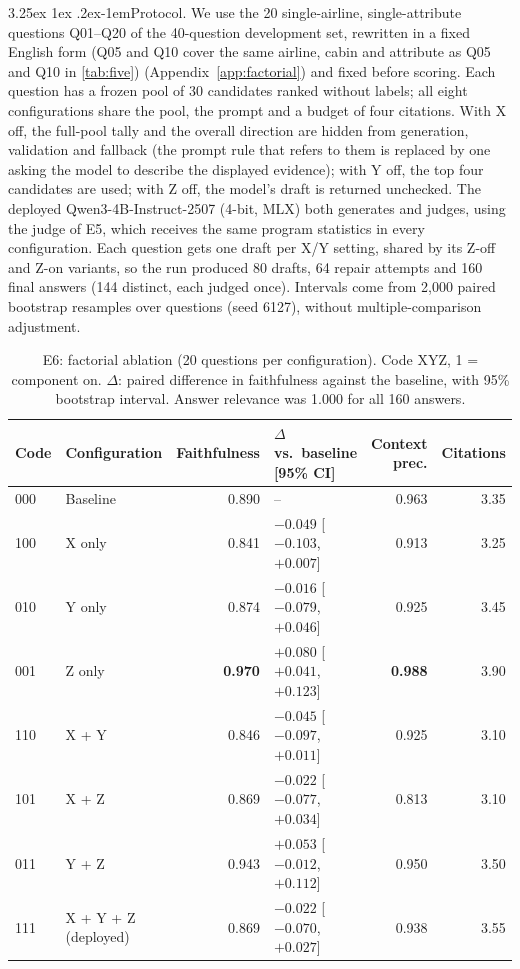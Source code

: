 \documentclass[10pt,twocolumn,a4paper]{article}
\makeatletter
\newcommand{\best}[1]{\textbf{#1}}
\renewcommand\paragraph{\@startsection{paragraph}{4}{\parindent}%
  {3.25ex \@plus 1ex \@minus .2ex}{-1em}{\normalfont\normalsize\bfseries}}
\makeatother
\begin{document}
\paragraph{Protocol.} We use the 20 single-airline, single-attribute questions Q01--Q20 of the 40-question
development set, rewritten in a fixed English form (Q05 and Q10 cover the same airline, cabin and attribute as Q05 and Q10 in
\cref{tab:five}) (Appendix~\ref{app:factorial}) and fixed before scoring. Each question has a frozen
pool of 30 candidates ranked without labels; all eight configurations share the pool, the prompt and a budget of four
citations. With X off, the full-pool tally and the overall direction are hidden from generation, validation and
fallback (the prompt rule that refers to them is replaced by one asking the model to describe the displayed evidence);
with Y off, the top four candidates are used; with Z off, the model's draft is returned unchecked. The deployed
Qwen3-4B-Instruct-2507 (4-bit, MLX) both generates and judges, using the judge of E5, which receives the same program
statistics in every configuration. Each question gets one draft per X/Y setting, shared by its Z-off and Z-on
variants, so the run produced 80 drafts, 64 repair attempts and 160 final answers (144 distinct, each judged once).
Intervals come from 2,000 paired bootstrap resamples over questions (seed 6127), without multiple-comparison
adjustment.

\begin{table}[t]
\centering\small
\caption{E6: factorial ablation (20 questions per configuration). Code XYZ, 1 = component on. $\Delta$: paired difference
in faithfulness against the baseline, with 95\% bootstrap interval. Answer relevance was 1.000 for all 160 answers.}
\label{tab:factorial}
\begin{tabular}{@{}llrlrr@{}}
\toprule
\textbf{Code} & \textbf{Configuration} & \textbf{Faithfulness} & \textbf{$\Delta$ vs.\ baseline [95\% CI]} & \textbf{Context prec.} & \textbf{Citations} \\
\midrule
000 & Baseline & 0.890 & -- & 0.963 & 3.35 \\
100 & X only & 0.841 & $-0.049$ [$-0.103$, $+0.007$] & 0.913 & 3.25 \\
010 & Y only & 0.874 & $-0.016$ [$-0.079$, $+0.046$] & 0.925 & 3.45 \\
\rowcolor{shade} 001 & Z only & \best{0.970} & $+0.080$ [$+0.041$, $+0.123$] & \best{0.988} & 3.90 \\
110 & X + Y & 0.846 & $-0.045$ [$-0.097$, $+0.011$] & 0.925 & 3.10 \\
101 & X + Z & 0.869 & $-0.022$ [$-0.077$, $+0.034$] & 0.813 & 3.10 \\
011 & Y + Z & 0.943 & $+0.053$ [$-0.012$, $+0.112$] & 0.950 & 3.50 \\
111 & X + Y + Z (deployed) & 0.869 & $-0.022$ [$-0.070$, $+0.027$] & 0.938 & 3.55 \\
\bottomrule
\end{tabular}
\end{table}
\end{document}
